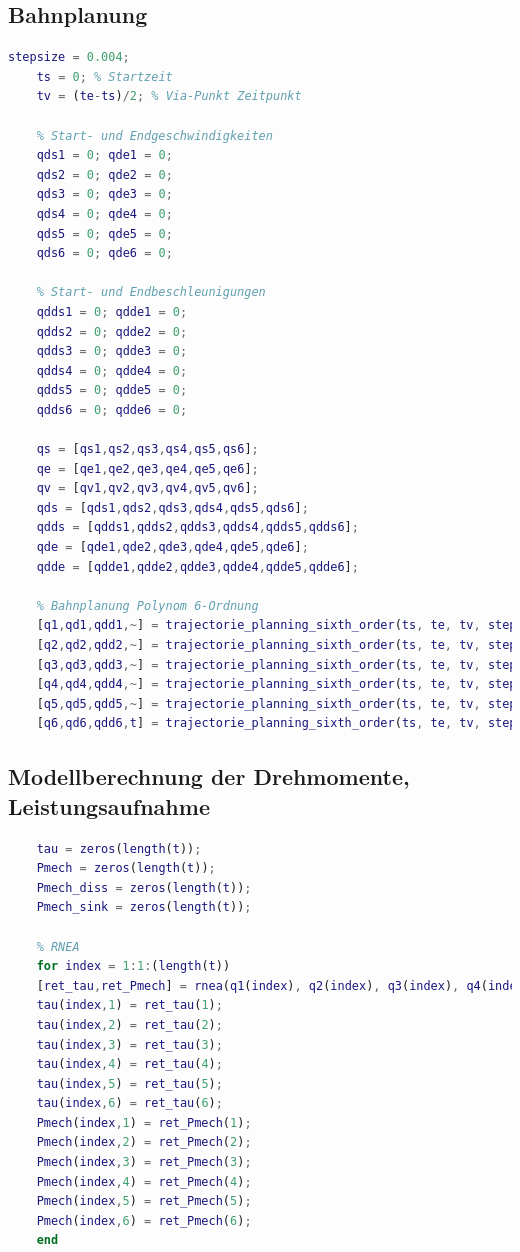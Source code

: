 \subsection{Bahnplanung}
%
\begin{lstlisting}[language=Matlab, numbers=none]
	stepsize = 0.004;
	ts = 0; % Startzeit
	tv = (te-ts)/2; % Via-Punkt Zeitpunkt
	
	% Start- und Endgeschwindigkeiten
	qds1 = 0; qde1 = 0;
	qds2 = 0; qde2 = 0;
	qds3 = 0; qde3 = 0;
	qds4 = 0; qde4 = 0;
	qds5 = 0; qde5 = 0;
	qds6 = 0; qde6 = 0;
	
	% Start- und Endbeschleunigungen
	qdds1 = 0; qdde1 = 0;
	qdds2 = 0; qdde2 = 0;
	qdds3 = 0; qdde3 = 0;
	qdds4 = 0; qdde4 = 0;
	qdds5 = 0; qdde5 = 0;
	qdds6 = 0; qdde6 = 0;
	
	qs = [qs1,qs2,qs3,qs4,qs5,qs6];
	qe = [qe1,qe2,qe3,qe4,qe5,qe6];
	qv = [qv1,qv2,qv3,qv4,qv5,qv6];
	qds = [qds1,qds2,qds3,qds4,qds5,qds6];
	qdds = [qdds1,qdds2,qdds3,qdds4,qdds5,qdds6];
	qde = [qde1,qde2,qde3,qde4,qde5,qde6];
	qdde = [qdde1,qdde2,qdde3,qdde4,qdde5,qdde6];
	
	% Bahnplanung Polynom 6-Ordnung
	[q1,qd1,qdd1,~] = trajectorie_planning_sixth_order(ts, te, tv, stepsize, qs(1), qds(1), qdds(1), qv(1), qe(1), qde(1), qdde(1));
	[q2,qd2,qdd2,~] = trajectorie_planning_sixth_order(ts, te, tv, stepsize, qs(2), qds(2), qdds(2), qv(2), qe(2), qde(2), qdde(2));
	[q3,qd3,qdd3,~] = trajectorie_planning_sixth_order(ts, te, tv, stepsize, qs(3), qds(3), qdds(3), qv(3), qe(3), qde(3), qdde(3));
	[q4,qd4,qdd4,~] = trajectorie_planning_sixth_order(ts, te, tv, stepsize, qs(4), qds(4), qdds(4), qv(4), qe(4), qde(4), qdde(4));
	[q5,qd5,qdd5,~] = trajectorie_planning_sixth_order(ts, te, tv, stepsize, qs(5), qds(5), qdds(5), qv(5), qe(5), qde(5), qdde(5));
	[q6,qd6,qdd6,t] = trajectorie_planning_sixth_order(ts, te, tv, stepsize, qs(6), qds(6), qdds(6), qv(6), qe(6), qde(6), qdde(6));
\end{lstlisting}
%
\subsection{Modellberechnung der Drehmomente, Leistungsaufnahme}
%
\begin{lstlisting}[language=Matlab, numbers=none]
	% Initialisierung
	tau = zeros(length(t));
	Pmech = zeros(length(t));
	Pmech_diss = zeros(length(t));
	Pmech_sink = zeros(length(t));
	
	% RNEA
	for index = 1:1:(length(t))
	[ret_tau,ret_Pmech] = rnea(q1(index), q2(index), q3(index), q4(index), q5(index), q6(index), qd1(index), qd2(index), qd3(index), qd4(index), qd5(index), qd6(index), qdd1(index), qdd2(index), qdd3(index), qdd4(index), qdd5(index), qdd6(index));
	tau(index,1) = ret_tau(1);
	tau(index,2) = ret_tau(2);
	tau(index,3) = ret_tau(3);
	tau(index,4) = ret_tau(4);
	tau(index,5) = ret_tau(5);
	tau(index,6) = ret_tau(6);
	Pmech(index,1) = ret_Pmech(1);
	Pmech(index,2) = ret_Pmech(2);
	Pmech(index,3) = ret_Pmech(3);
	Pmech(index,4) = ret_Pmech(4);
	Pmech(index,5) = ret_Pmech(5);
	Pmech(index,6) = ret_Pmech(6);
	end
\end{lstlisting}
%
